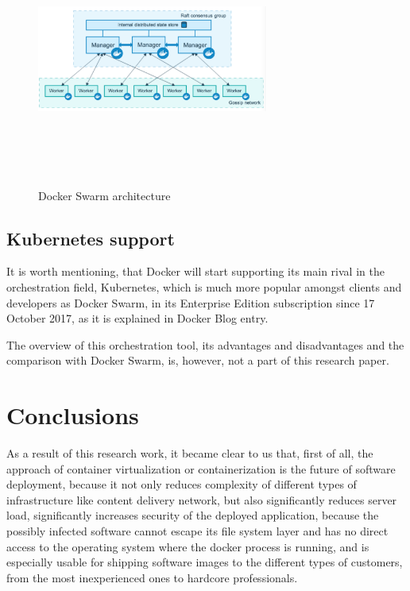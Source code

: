 \begin{figure}
\includegraphics[height=3in, width=3in]{DockerSwarm}
\caption{Docker Swarm architecture}
\cite{DockerSwarmPic}
\label{fig:DockerSwarmPic}
\end{figure}

\subsection{Kubernetes support}

It is worth mentioning,
that Docker will start
supporting its main rival in the orchestration field, Kubernetes,
which is much more popular amongst clients and developers as Docker Swarm,
in its Enterprise Edition subscription since 17 October 2017,
as it is explained in Docker Blog entry\cite{DockerKubernetesSupport}.

The overview of this orchestration tool, its advantages and disadvantages
and the comparison with Docker Swarm, is, however, not a part of
this research paper.

\section{Conclusions}

As a result of this research work, it became clear to us that, first of all,
the approach of container virtualization or containerization
is the future of software deployment, because it not only reduces complexity of
different types of infrastructure like content delivery network,
but also significantly reduces server load, significantly
increases security of the deployed application,
because the possibly infected software cannot
escape its file system layer and has no direct access
to the operating system where the docker process is running, and is
especially usable for shipping software
images to the different types of customers,
from the most inexperienced ones to hardcore professionals.

